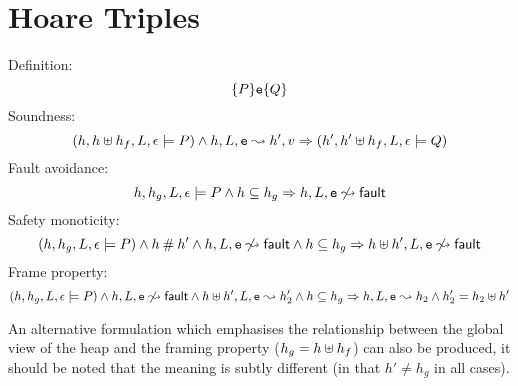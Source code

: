 \documentclass[a4paper,notitlepage]{report}
\begin{document}
\section{Hoare Triples}
Definition:
\[ \{P\}\mathtt{e}\{Q\} \]
Soundness:
\[ (h, h \uplus h_f, L, \epsilon \models P) \land h, L, \mathtt{e} \leadsto h', v
  \Rightarrow (h', h' \uplus h_f, L, \epsilon \models Q) \]
Fault avoidance:
\[ h, h_g, L, \epsilon \models P \land h\subseteq h_g \Rightarrow h, L, \mathtt{e} \not\leadsto {\ensuremath{\mathsf{fault}}} \]
Safety monoticity:
\[ (h, h_g, L, \epsilon \models P) \land h \mathbin{\#} h' \land h, L, \mathtt{e} \not\leadsto
  {\ensuremath{\mathsf{fault}}} \land h\subseteq h_g \Rightarrow h \uplus h', L, \mathtt{e} \not\leadsto {\ensuremath{\mathsf{fault}}} \]
Frame property:
\[ (h, h_g, L, \epsilon \models P) \land h, L, \mathtt{e} \not\leadsto {\ensuremath{\mathsf{fault}}} \land
  h \uplus h', L, \mathtt{e} \leadsto h_2' \land h\subseteq h_g\Rightarrow h, L, \mathtt{e} \leadsto h_2 \land
  h_2' = h_2 \uplus h' \]

An alternative formulation which emphasises the relationship between the global
view of the heap and the framing property ($h_g = h \uplus h_f$) can also be
produced, it should be noted that the meaning is subtly different (in that $h'
\neq h_g$ in all cases).
\end{document}

